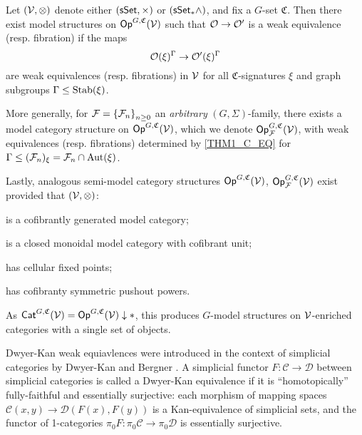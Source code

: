\documentclass[a4paper,10pt
,draft
]{article}%
\renewcommand{\F}{\mathcal F}
\renewcommand{\1}{\eta}%
\begin{document}
\begin{theorem}
      \label{THM1_C}
      Let $(\mathcal V,\otimes)$ denote either $(\mathsf{sSet}, \times)$ or $(\sSet_{\**} \wedge)$,
      and fix a $G$-set $\mathfrak C$.
      Then there exist model structures on $\mathsf{Op}^{G, \mathfrak C}(\mathcal V)$ such that
      $\mathcal{O} \to \mathcal{O}'$ is a weak equivalence (resp. fibration) if the maps
      \begin{equation}
            \label{THM1_C_EQ}
            \mathcal{O}(\xi)^\Gamma \to \mathcal{O}'(\xi)^\Gamma
      \end{equation}
      are weak equivalences (resp. fibrations) in $\mathcal V$ for all
      $\mathfrak C$-signatures $\xi$ and
      graph subgroups $\Gamma \leq \operatorname{Stab}(\xi)$.

      More generally, for $\F = \set{\F_n}_{n \geq 0}$ an \textit{arbitrary} $(G, \Sigma)$-family,
      there exists a model category structure on $\mathsf{Op}^{G, \mathfrak C}(\mathcal V)$, which we denote $\Op^{G, \mathfrak C}_\F(\V)$,
      with weak equivalences (resp. fibrations) determined by \eqref{THM1_C_EQ} for $\Gamma \leq (\F_n)_\ksi = \F_n \cap \Aut(\ksi)$.

      Lastly, analogous semi-model category structures $\mathsf{Op}^{G, \mathfrak C}(\mathcal V)$, $\Op^{G, \mathfrak C}_\F(\V)$ exist provided that
      $(\mathcal V, \otimes)$:
      \begin{enumerate*}[label = (\roman*)]
      \item is a cofibrantly generated model category;
      \item is a closed monoidal model category with cofibrant unit;
      \item has cellular fixed points;
      \item has cofibranty symmetric pushout powers.
      \end{enumerate*}
\end{theorem}

\begin{remark}
      As $\Cat^{G, \mathfrak C}(\V) = \Op^{G, \mathfrak C}(\V) \downarrow \**$,
      this produces $G$-model structures on $\mathcal V$-enriched categories with a single set of objects.
\end{remark}




Dwyer-Kan weak equiavlences were introduced in the context of simplicial categories by Dwyer-Kan and Bergner \cite{DK80, Ber07b}.
A simplicial functor $F: \mathcal C \to \mathcal D$ between simplicial categories is called a Dwyer-Kan equivalence if
it is ``homotopically'' fully-faithful and essentially surjective:
each morphism of mapping spaces $\mathcal C(x, y) \to \mathcal D(F(x), F(y))$ is a Kan-equivalence of simplicial sets, and
the functor of 1-categories $\pi_0F: \pi_0\mathcal C \to \pi_0 \mathcal D$ is essentially surjective.
\end{document}
